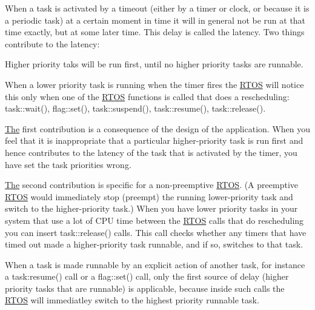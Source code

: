 When a task is activated by a timeout (either by a timer or clock, or because it is a periodic task) at a certain moment in time it will in general not be run at that time exactly, but at some later time. This delay is called the latency. Two things contribute to the latency\+:


\begin{DoxyEnumerate}
\item Higher priority taks will be run first, until no higher priority tasks are runnable.
\item When a lower priority task is running when the timer fires the \hyperlink{class_r_t_o_s}{R\+T\+OS} will notice this only when one of the \hyperlink{class_r_t_o_s}{R\+T\+OS} functions is called that does a rescheduling\+: task\+::wait(), flag\+::set(), task\+::suspend(), task\+::resume(), task\+::release().
\end{DoxyEnumerate}

\hyperlink{class_the}{The} first contribution is a consequence of the design of the application. When you feel that it is inappropriate that a particular higher-\/priority task is run first and hence contributes to the latency of the task that is activated by the timer, you have set the task priorities wrong.

\hyperlink{class_the}{The} second contribution is specific for a non-\/preemptive \hyperlink{class_r_t_o_s}{R\+T\+OS}. (A preemptive \hyperlink{class_r_t_o_s}{R\+T\+OS} would immediately stop (preempt) the running lower-\/priority task and switch to the higher-\/priority task.) When you have lower priority tasks in your system that use a lot of C\+PU time between the \hyperlink{class_r_t_o_s}{R\+T\+OS} calls that do rescheduling you can insert task\+::release() calls. This call checks whether any timers that have timed out made a higher-\/priority task runnable, and if so, switches to that task.

When a task is made runnable by an explicit action of another task, for instance a task\+:resume() call or a flag\+::set() call, only the first source of delay (higher priority tasks that are runnable) is applicable, because inside such calls the \hyperlink{class_r_t_o_s}{R\+T\+OS} will immediatley switch to the highest priority runnable task. 